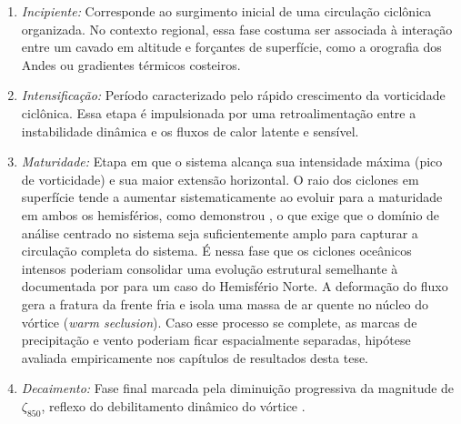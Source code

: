 \begin{enumerate}
    \item \textit{Incipiente:} Corresponde ao surgimento inicial de uma circulação ciclônica organizada.
    No contexto regional, essa fase costuma ser associada à interação entre um cavado em altitude e forçantes de superfície, como a orografia dos Andes ou gradientes térmicos costeiros.

    \item \textit{Intensificação:} Período caracterizado pelo rápido crescimento da vorticidade ciclônica.
    Essa etapa é impulsionada por uma retroalimentação entre a instabilidade dinâmica e os fluxos de calor latente e sensível.

    \item \textit{Maturidade:} Etapa em que o sistema alcança sua intensidade máxima (pico de vorticidade) e sua maior extensão horizontal. O raio dos ciclones em superfície tende a aumentar sistematicamente ao evoluir para a maturidade em ambos os hemisférios, como demonstrou \citet{simmonds2000size}, o que exige que o domínio de análise centrado no sistema seja suficientemente amplo para capturar a circulação completa do sistema.
    É nessa fase que os ciclones oceânicos intensos poderiam consolidar uma evolução estrutural semelhante à documentada por \citet{shapiro1999bridge} para um caso do Hemisfério Norte. A deformação do fluxo gera a fratura da frente fria e isola uma massa de ar quente no núcleo do vórtice (\textit{warm seclusion}).
    Caso esse processo se complete, as marcas de precipitação e vento poderiam ficar espacialmente separadas, hipótese avaliada empiricamente nos capítulos de resultados desta tese.

    \item \textit{Decaimento:} Fase final marcada pela diminuição progressiva da magnitude de $\zeta_{850}$, reflexo do debilitamento dinâmico do vórtice \citep{coutodesouza2024thesis}.
\end{enumerate}


